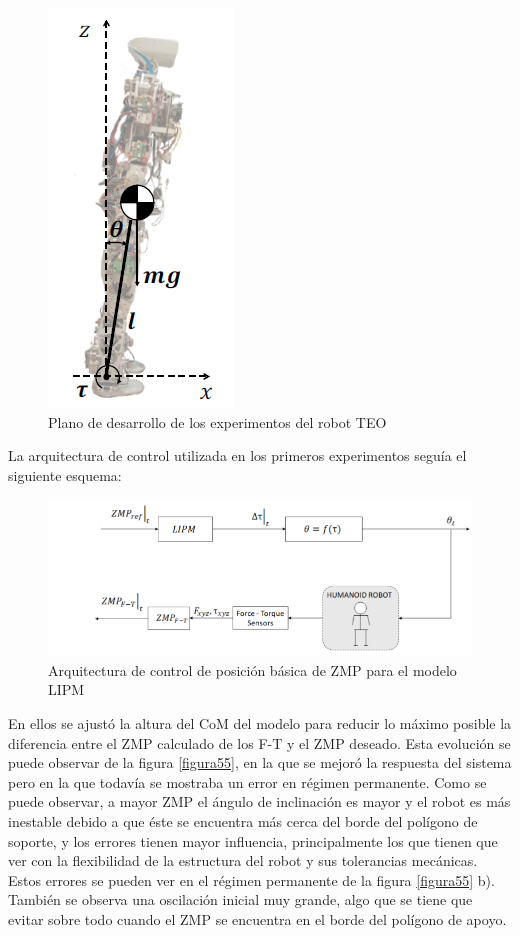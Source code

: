 \begin{figure}[H]
\centering
\includegraphics[scale=0.65]{imagenes/apartado_5/53_postura_inicial_experimental_teo}
\caption{Plano de desarrollo de los experimentos del robot TEO}
\label{figura53}
\end{figure}

La arquitectura de control utilizada en los primeros experimentos seguía el siguiente esquema:

\begin{figure}[H]
\centering
\includegraphics[scale=2.2]{imagenes/apartado_5/54_esquema_bucle_abierto}
\caption{Arquitectura de control de posición básica de ZMP para el modelo LIPM}
\label{figura54}
\end{figure}


En ellos se ajustó la altura del CoM del modelo para reducir lo máximo posible la diferencia entre el ZMP calculado de los F-T y el ZMP deseado. Esta evolución se puede observar de la figura \ref{figura55}, en la que se mejoró la respuesta del sistema pero en la que todavía se mostraba un error en régimen permanente. Como se puede observar, a mayor ZMP el ángulo de inclinación es mayor y el robot es más inestable debido a que éste se encuentra más cerca del borde del polígono de soporte, y los errores tienen mayor influencia, principalmente los que tienen que ver con la flexibilidad de la estructura del robot y sus tolerancias mecánicas. Estos errores se pueden ver en el régimen permanente de la figura \ref{figura55} b). También se observa una oscilación inicial muy grande, algo que se tiene que evitar sobre todo cuando el ZMP se encuentra en el borde del polígono de apoyo. 

